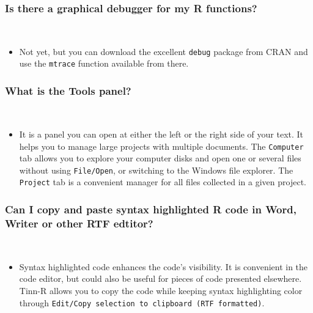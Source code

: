 \subsubsection{Is there a graphical debugger for my R functions?}\\

\begin{itemize}
  \item Not yet, but you can download the excellent \texttt{debug}
    package from CRAN and use the \texttt{mtrace} function available
    from there.
\end{itemize}


\subsubsection{What is the Tools panel?}\\

\begin{itemize}
  \item It is a panel you can open at either the left or the right
    side of your text. It helps you to manage large projects with
    multiple documents. The \texttt{Computer} tab allows you to
    explore your computer disks and open one or several files
    without using \texttt{File/Open}, or switching to the Windows
    file explorer. The \texttt{Project} tab is a convenient manager
    for all files collected in a given project.
\end{itemize}


\subsubsection{Can I copy and paste syntax highlighted R code in Word, Writer or other RTF edtitor?}\\

\begin{itemize}
  \item Syntax highlighted code enhances the code's visibility. It is
    convenient in the code editor, but could also be useful for
    pieces of code presented elsewhere. Tinn-R allows you to copy the code while
    keeping syntax highlighting color through \texttt{Edit/Copy
    selection to clipboard (RTF formatted)}.
\end{itemize}


